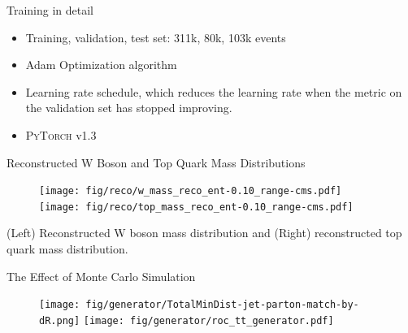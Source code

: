 \begin{frame}[fragile]{Training in detail}
    \begin{itemize}
        \item Training, validation, test set: 311k, 80k, 103k events
        \item Adam Optimization algorithm
        \item Learning rate schedule, which reduces the learning rate when the metric on the validation set has stopped improving.
        \item \textsc{PyTorch} v1.3
    \end{itemize}
\end{frame}

\begin{frame}[fragile]{Reconstructed W Boson and Top Quark Mass Distributions}
    \begin{figure}
        \centering
        \texttt{[image: fig/reco/w\_mass\_reco\_ent-0.10\_range-cms.pdf]}
        \texttt{[image: fig/reco/top\_mass\_reco\_ent-0.10\_range-cms.pdf]}
    \end{figure}
    (Left) Reconstructed W boson mass distribution and (Right) reconstructed top quark mass distribution.
\end{frame}

\begin{frame}[fragile]{The Effect of Monte Carlo Simulation}
    \begin{figure}
        \centering
        \texttt{[image: fig/generator/TotalMinDist-jet-parton-match-by-dR.png]}
        \texttt{[image: fig/generator/roc\_tt\_generator.pdf]}
    \end{figure}
\end{frame}


